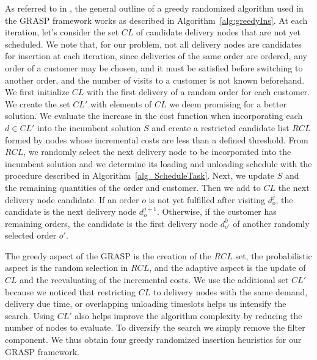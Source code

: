 \documentclass{article}
\begin{document}
As referred to in \cite{resende2019greedy}, the general outline of a greedy randomized algorithm used in the GRASP framework works as described in Algorithm~\ref{alg:greedyIns}. At each iteration, let's consider the set $CL$ of candidate delivery nodes that are not yet scheduled. We note that, for our problem, not all delivery nodes are candidates for insertion at each iteration, since deliveries of the same order are ordered, any order of a customer may be chosen, and it must be satisfied before switching to another order, and the number of visits to a customer is not known beforehand. We first initialize $CL$ with the first delivery of a random order for each customer. We create the set $CL'$ with elements of $CL$ we deem promising for a better solution. We evaluate the increase in the cost function when incorporating each $d \in CL'$ into the incumbent solution $S$ and create a restricted candidate list $RCL$ formed by nodes whose incremental costs are less than a defined threshold. From $RCL$, we randomly select the next delivery node to be incorporated into the incumbent solution and we determine its loading and unloading schedule with the procedure described in Algorithm~\ref{alg_ScheduleTask}. Next, we update $S$ and the remaining quantities of the order and customer. Then we add to $CL$ the next delivery node candidate. If an order $o$ is not yet fulfilled after visiting $d^j_{o}$, the candidate is the next delivery node $d^{j+1}_{o}$. Otherwise, if the customer has remaining orders, the candidate is the first delivery node $d^{0}_{o'}$ of another randomly selected order $o'$.

The greedy aspect of the GRASP is the creation of the $RCL$ set, the probabilistic aspect is the random selection in $RCL$, and the adaptive aspect is the update of $CL$ and the reevaluating of the incremental costs. We use the additional set $CL'$ because we noticed that restricting $CL$ to delivery nodes with the same demand, delivery due time, or overlapping unloading timeslots helps us intensify the search. Using $CL'$ also helps improve the algorithm complexity by reducing the number of nodes to evaluate. To diversify the search we simply remove the filter component. We thus obtain four greedy randomized insertion heuristics for our GRASP framework.
\end{document}
